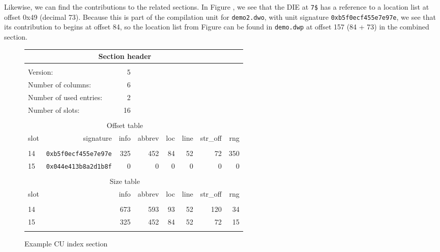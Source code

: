 Likewise, we can find the contributions to the related sections.
In Figure , 
we see that the \DWTAGvariable{} DIE at \texttt{7\$} has a
reference to a location list at offset 0x49 (decimal 73). Because
this is part of the compilation unit for \texttt{demo2.dwo}, with 
unit signature \texttt{0xb5f0ecf455e7e97e}, we see that its contribution 
to \dotdebugloclistsdwo{} begins at offset 84, so the location list from
Figure  
can be found in \texttt{demo.dwp} at offset 157 (84 + 73) in
the combined \dotdebugloclistsdwo{} section.

\begin{figure}[ht]
\begin{center}
\begin{tabular}{lrrrrrrr}
\\
  \multicolumn{7}{c}{Section header} \\
\hline \\
  \multicolumn{2}{l}{Version:}&                 5  &&&&&\\
  \multicolumn{2}{l}{Number of columns:}&       6  &&&&&\\
  \multicolumn{2}{l}{Number of used entries:}&  2  &&&&&\\
  \multicolumn{2}{l}{Number of slots:}&         16 &&&&&\\
\\
  \multicolumn{7}{c}{Offset table} \\
  \hline
  slot&  signature&                       info&   abbrev&      loc&     line& str\_off&    rng \\ \\
    14& \texttt{0xb5f0ecf455e7e97e} &      325&      452&       84&       52&       72&    350 \\
    15& \texttt{0x044e413b8a2d1b8f} &        0&        0&        0&        0&        0&      0 \\
\\
  \multicolumn{7}{c}{Size table} \\
  \hline
  slot&                    &     info&   abbrev&      loc&     line& str\_off&    rng \\ \\
    14&                    &      673&      593&       93&       52&      120&     34 \\
    15&                    &      325&      452&       84&       52&       72&     15 \\
\\ \hline 
\end{tabular}
\end{center}
\caption{Example CU index section}
\label{fig:examplecuindexsection}
\end{figure}

